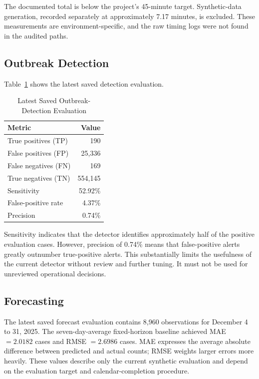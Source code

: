 \documentclass[conference]{IEEEtran}
\begin{document}
The documented total is below the project's 45-minute target. Synthetic-data generation, recorded separately at approximately 7.17 minutes, is excluded. These measurements are environment-specific, and the raw timing logs were not found in the audited paths.

\subsection{Outbreak Detection}

Table~\ref{tab:detection} shows the latest saved detection evaluation.

\begin{table}[htbp]
\caption{Latest Saved Outbreak-Detection Evaluation}
\label{tab:detection}
\centering
\begin{tabular}{lr}
\toprule
Metric & Value \\
\midrule
True positives (TP) & 190 \\
False positives (FP) & 25,336 \\
False negatives (FN) & 169 \\
True negatives (TN) & 554,145 \\
Sensitivity & 52.92\% \\
False-positive rate & 4.37\% \\
Precision & 0.74\% \\
\bottomrule
\end{tabular}
\end{table}

Sensitivity indicates that the detector identifies approximately half of the positive evaluation cases. However, precision of 0.74\% means that false-positive alerts greatly outnumber true-positive alerts. This substantially limits the usefulness of the current detector without review and further tuning. It must not be used for unreviewed operational decisions.

\subsection{Forecasting}

The latest saved forecast evaluation contains 8,960 observations for December 4 to 31, 2025. The seven-day-average fixed-horizon baseline achieved MAE \(=2.0182\) cases and RMSE \(=2.6986\) cases. MAE expresses the average absolute difference between predicted and actual counts; RMSE weights larger errors more heavily. These values describe only the current synthetic evaluation and depend on the evaluation target and calendar-completion procedure.
\end{document}
